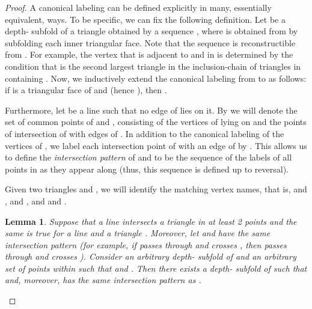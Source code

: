 \documentclass[reqno,12pt]{amsart}
\newtheorem{lemma}[theorem]{Lemma}
\begin{document}
\begin{proof}
A canonical labeling can be defined explicitly in many, essentially equivalent, ways.
To be specific, we can fix the following definition.
Let  be a depth- subfold of a triangle  obtained by a sequence
, where  is obtained from  by subfolding
each inner triangular face. Note that the sequence  is reconstructible
from . For example, the vertex  that is adjacent to  and  in 
is determined by the condition that  is the second largest triangle in
the inclusion-chain of triangles in  containing .
Now, we inductively extend the canonical labeling  from  to 
as follows:
if  is a triangular face of  and 
(hence ), then .

Furthermore, let  be a line such that no edge of  lies on it.
By  we will denote the set of common points of  and ,
consisting of the vertices of  lying on  and the points of intersection
of  with edges of . In addition to the canonical labeling of the vertices
of , we label each intersection point of  with an edge  of 
by . This allows us to define the \emph{intersection pattern}
of  and  to be the sequence of the labels of all points in 
as they appear along  (thus, this sequence is defined up to reversal).

Given two triangles  and , we will identify the matching vertex names,
that is,  and ,  and , and  and .

\begin{lemma}\label{lem:foldfree2}
Suppose that a line  intersects a triangle  in at least 2 points
and the same is true for a line  and a triangle .
Moreover, let  and  have the same intersection
pattern (for example, if  passes through  and crosses , then
 passes through  and crosses ).
Consider an arbitrary depth- subfold  of  and an arbitrary
set of points  within  such that
 and .
Then there exists a depth- subfold  of  such that
 and, moreover,  has the same intersection pattern
as .
\end{lemma}


\end{proof}
\end{document}
